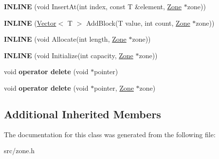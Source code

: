 \begin{DoxyCompactItemize}
\item 
\hypertarget{classv8_1_1internal_1_1_zone_list_a499210e9f26dfd80e71c3e828d0b7495}{}{\bfseries I\+N\+L\+I\+N\+E} (void Insert\+At(int index, const T \&element, \hyperlink{classv8_1_1internal_1_1_zone}{Zone} $\ast$zone))\label{classv8_1_1internal_1_1_zone_list_a499210e9f26dfd80e71c3e828d0b7495}

\item 
\hypertarget{classv8_1_1internal_1_1_zone_list_aa4a8c472612e7cce0daa0bdd0bab8dca}{}{\bfseries I\+N\+L\+I\+N\+E} (\hyperlink{classv8_1_1internal_1_1_vector}{Vector}$<$ T $>$ Add\+Block(T value, int count, \hyperlink{classv8_1_1internal_1_1_zone}{Zone} $\ast$zone))\label{classv8_1_1internal_1_1_zone_list_aa4a8c472612e7cce0daa0bdd0bab8dca}

\item 
\hypertarget{classv8_1_1internal_1_1_zone_list_a3064c1dd0f06a0232eb85dfd255e3dea}{}{\bfseries I\+N\+L\+I\+N\+E} (void Allocate(int length, \hyperlink{classv8_1_1internal_1_1_zone}{Zone} $\ast$zone))\label{classv8_1_1internal_1_1_zone_list_a3064c1dd0f06a0232eb85dfd255e3dea}

\item 
\hypertarget{classv8_1_1internal_1_1_zone_list_aceddde8fc6199f972f8e03eecbfb57ea}{}{\bfseries I\+N\+L\+I\+N\+E} (void Initialize(int capacity, \hyperlink{classv8_1_1internal_1_1_zone}{Zone} $\ast$zone))\label{classv8_1_1internal_1_1_zone_list_aceddde8fc6199f972f8e03eecbfb57ea}

\item 
\hypertarget{classv8_1_1internal_1_1_zone_list_ad34e89232a7e498218bab40cb231798d}{}void {\bfseries operator delete} (void $\ast$pointer)\label{classv8_1_1internal_1_1_zone_list_ad34e89232a7e498218bab40cb231798d}

\item 
\hypertarget{classv8_1_1internal_1_1_zone_list_a92bd2e802a848cf5986f45a740c740c3}{}void {\bfseries operator delete} (void $\ast$pointer, \hyperlink{classv8_1_1internal_1_1_zone}{Zone} $\ast$zone)\label{classv8_1_1internal_1_1_zone_list_a92bd2e802a848cf5986f45a740c740c3}

\end{DoxyCompactItemize}
\subsection*{Additional Inherited Members}


The documentation for this class was generated from the following file\+:\begin{DoxyCompactItemize}
\item 
src/zone.\+h\end{DoxyCompactItemize}
